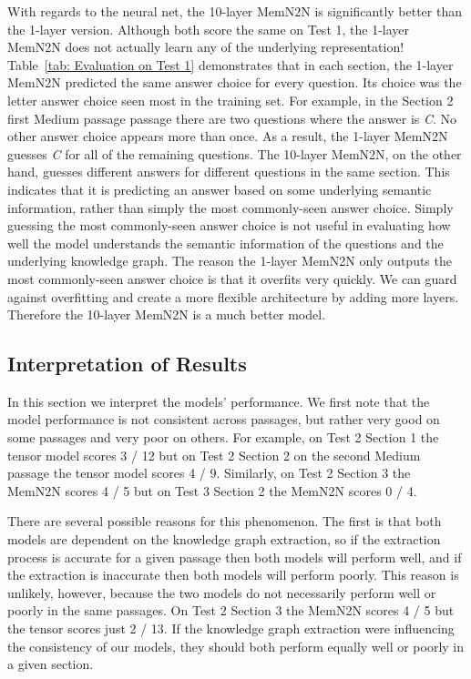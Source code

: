 \documentclass[pageno]{final_paper}
\begin{document}
With regards to the neural net, the 10-layer MemN2N is significantly better than
the 1-layer version. Although both score the same on Test 1, the 1-layer MemN2N
does not actually learn any of the underlying representation! Table~\ref{tab:
Evaluation on Test 1} demonstrates that in each section, the 1-layer MemN2N
predicted the same answer choice for every question. Its choice was the letter
answer choice seen most in the training set. For example, in the Section 2 first
Medium passage passage there are two questions where the answer is \textit{C}.
No other answer choice appears more than once. As a result, the 1-layer MemN2N
guesses \textit{C} for all of the remaining questions. The 10-layer MemN2N, on
the other hand, guesses different answers for different questions in the same
section. This indicates that it is predicting an answer based on some underlying
semantic information, rather than simply the most commonly-seen answer choice.
Simply guessing the most commonly-seen answer choice is not useful in evaluating
how well the model understands the semantic information of the questions and the
underlying knowledge graph. The reason the 1-layer MemN2N only outputs the most
commonly-seen answer choice is that it overfits very quickly. We can guard
against overfitting and create a more flexible architecture by adding more
layers. Therefore the 10-layer MemN2N is a much better model.

\subsection{Interpretation of Results}
\label{Interpretation of Results}

In this section we interpret the models' performance. We first note that the
model performance is not consistent across passages, but rather very good on
some passages and very poor on others. For example, on Test 2 Section 1 the
tensor model scores 3 / 12 but on Test 2 Section 2 on the second Medium passage
the tensor model scores 4 / 9. Similarly, on Test 2 Section 3 the MemN2N scores
4 / 5 but on Test 3 Section 2 the MemN2N scores 0 / 4.

There are several possible reasons for this phenomenon. The first is that both
models are dependent on the knowledge graph extraction, so if the extraction
process is accurate for a given passage then both models will perform well, and
if the extraction is inaccurate then both models will perform poorly. This
reason is unlikely, however, because the two models do not necessarily perform
well or poorly in the same passages. On Test 2 Section 3 the MemN2N scores 4 / 5
but the tensor scores just 2 / 13. If the knowledge graph extraction were
influencing the consistency of our models, they should both perform equally well
or poorly in a given section.
\end{document}
